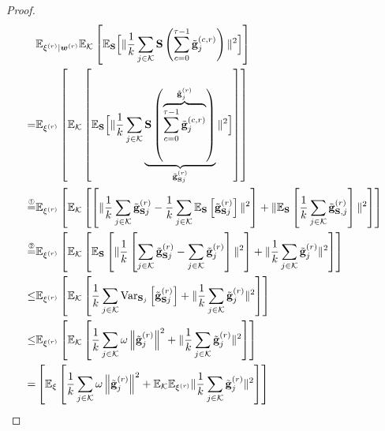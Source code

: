 \documentclass[sigconf, anonymous, review]{acmart}
\begin{document}
\begin{proof}
\begin{align}
&\mathbb{E}_{{\xi^{(r)}|\boldsymbol{w}^{(r)}}}\mathbb{E}_{\mathcal{K}}\left[\mathbb{E}_{{\mathbf{S}}}\Big[\|\frac{1}{k}\sum_{j\in \mathcal{K}} \mathbf{S}\left(\sum_{c=0}^{\tau-1}\tilde{\mathbf{g}}^{(c,r)}_j\right)\|^2\Big]\right]\nonumber\\
=&\mathbb{E}_{{\xi}^{(r)}}\left[\mathbb{E}_{\mathcal{K}}\left[\mathbb{E}_{\mathbf{S}}\Big[\|\frac{1}{k}\sum_{j\in\mathcal{K}}\underbrace{\mathbf{S}\left(\overbrace{\sum_{c=0}^{\tau-1}\tilde{\mathbf{g}}^{(c,r)}_j}^{\tilde{\mathbf{g}}_j^{(r)}}\right)}_{\tilde{\mathbf{g}}_{\mathbf{S}j}^{(r)}}\|^2\Big]\right]\right]\nonumber\\
\stackrel{\text{\ding{192}}}{=}&\mathbb{E}_{{\xi}^{(r)}}\left[\mathbb{E}_{\mathcal{K}}\left[\left[\|\frac{1}{k}\sum_{j\in\mathcal{K}}\tilde{\mathbf{g}}_{\mathbf{S}j}^{(r)}-\frac{1}{k}\sum_{j\in\mathcal{K}}\mathbb{E}_{\mathbf{S}}\left[\tilde{\mathbf{g}}_{\mathbf{S}j}^{(r)}\right]\|^2\right]+\|\mathbb{E}_{\mathbf{S}}\left[\frac{1}{k}\sum_{j\in\mathcal{K}}\tilde{\mathbf{g}}_{\mathbf{S},j}^{(r)}\right]\|^2\right]\right]\nonumber\\
\stackrel{\text{\ding{193}}}{=}&\mathbb{E}_{{\xi}^{(r)}}\left[\mathbb{E}_{\mathcal{K}}\left[\mathbb{E}_{\mathbf{S}}\left[\|\frac{1}{k}\left[\sum_{j\in\mathcal{K}}\tilde{\mathbf{g}}_{\mathbf{S}j}^{(r)}-\sum_{j\in\mathcal{K}}\tilde{\mathbf{g}}_{j}^{(r)}\right]\|^2\right]+\|\frac{1}{k}\sum_{j\in\mathcal{K}}\tilde{\mathbf{g}}_{j}^{(r)}\|^2\right]\right]\nonumber\\
\stackrel{}{\leq}& \mathbb{E}_{{\xi}^{(r)}}\left[\mathbb{E}_{\mathcal{K}}\left[\frac{1}{k}\sum_{j\in\mathcal{K}}\text{Var}_{\mathbf{S}_j}\left[\tilde{\mathbf{g}}_{\mathbf{S}j}^{(r)}\right]+\|\frac{1}{k}\sum_{j\in\mathcal{K}}\tilde{\mathbf{g}}_{j}^{(r)}\|^2\right]\right]\nonumber\\
\stackrel{}{\leq}& \mathbb{E}_{{\xi}^{(r)}}\left[\mathbb{E}_{\mathcal{K}}\left[\frac{1}{k}\sum_{j\in\mathcal{K}}\omega\left\|\tilde{\mathbf{g}}_{j}^{(r)}\right\|^2+\|\frac{1}{k}\sum_{j\in\mathcal{K}}\tilde{\mathbf{g}}_{j}^{(r)}\|^2\right]\right]\nonumber\\
\stackrel{}{=}& \left[\mathbb{E}_{\xi}\left[\frac{1}{k}\sum_{j\in\mathcal{K}}\omega\left\|\tilde{\mathbf{g}}_{j}^{(r)}\right\|^2+\mathbb{E}_{\mathcal{K}}\mathbb{E}_{{\xi}^{(r)}}\|\frac{1}{k}\sum_{j\in\mathcal{K}}\tilde{\mathbf{g}}_{j}^{(r)}\|^2\right]\right]\nonumber\\

\end{align}
\end{proof}
\end{document}
